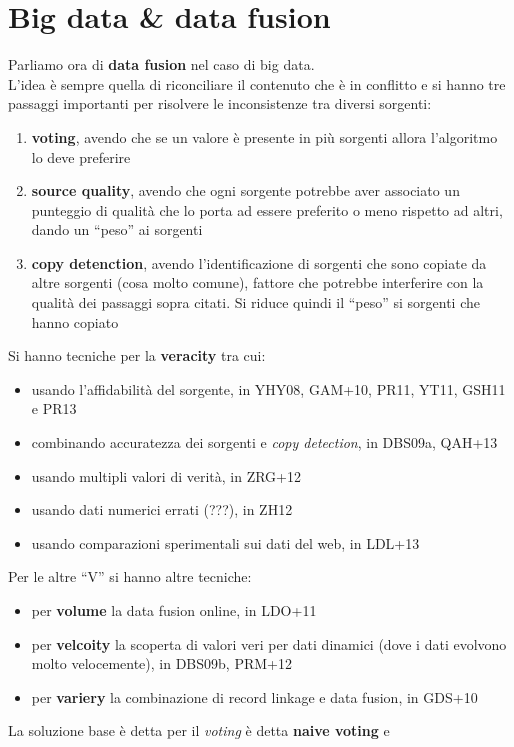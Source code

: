 \documentclass[a4paper,12pt, oneside]{book}
\begin{document}
\section{Big data \& data fusion}
Parliamo ora di \textbf{data fusion} nel caso di big data.\\
L'idea è sempre quella di riconciliare il contenuto che è in conflitto e si
hanno tre passaggi importanti per risolvere le inconsistenze tra diversi
sorgenti: 
\begin{enumerate}
  \item \textbf{voting}, avendo che se un valore è presente in più sorgenti
  allora l'algoritmo lo deve preferire
  \item \textbf{source quality}, avendo che ogni sorgente potrebbe aver
  associato un punteggio di qualità che lo porta ad essere preferito o meno
  rispetto ad altri, dando un ``peso'' ai sorgenti
  \item \textbf{copy detenction}, avendo l'identificazione di sorgenti che sono
  copiate da altre sorgenti (cosa molto comune), fattore che potrebbe
  interferire con la qualità dei passaggi sopra citati. Si riduce quindi il
  ``peso'' si sorgenti che hanno copiato
\end{enumerate}
Si hanno tecniche per la \textbf{veracity} tra cui:
\begin{itemize}
  \item usando l'affidabilità del sorgente, in YHY08, GAM+10, PR11, YT11, GSH11
  e PR13 
  \item combinando accuratezza dei sorgenti e \textit{copy detection}, in
  DBS09a, QAH+13 
  \item usando multipli valori di verità, in ZRG+12
  \item usando dati numerici errati (???), in ZH12
  \item usando comparazioni sperimentali sui dati del web, in LDL+13
\end{itemize}
Per le altre ``V'' si hanno altre tecniche:
\begin{itemize}
  \item per \textbf{volume} la data fusion online, in LDO+11
  \item per \textbf{velcoity} la scoperta di valori veri per dati dinamici (dove
  i dati evolvono molto velocemente), in
  DBS09b, PRM+12
  \item per \textbf{variery} la combinazione di record linkage e data fusion, in
  GDS+10 
\end{itemize}
La soluzione base è detta per il \textit{voting} è detta \textbf{naive voting} e
\end{document}
